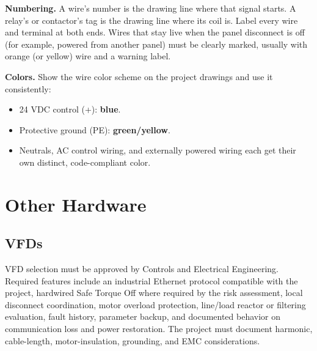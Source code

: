 \textbf{Numbering.} A wire's number is the drawing line where that signal starts. A relay's or contactor's tag is the drawing line where its coil is. Label every wire and terminal at both ends. Wires that stay live when the panel disconnect is off (for example, powered from another panel) must be clearly marked, usually with orange (or yellow) wire and a warning label.

\textbf{Colors.} Show the wire color scheme on the project drawings and use it consistently:
\begin{itemize}[itemsep=1pt]
  \item 24 VDC control (+): \textbf{blue}.
  \item Protective ground (PE): \textbf{green/yellow}.
  \item Neutrals, AC control wiring, and externally powered wiring each get their own distinct, code-compliant color.
\end{itemize}

\section{Other Hardware}
\subsection{VFDs}\label{sec:vfd}
VFD selection must be approved by Controls and Electrical Engineering. Required features include an industrial Ethernet protocol compatible with the project, hardwired Safe Torque Off where required by the risk assessment, local disconnect coordination, motor overload protection, line/load reactor or filtering evaluation, fault history, parameter backup, and documented behavior on communication loss and power restoration. The project must document harmonic, cable-length, motor-insulation, grounding, and EMC considerations.

